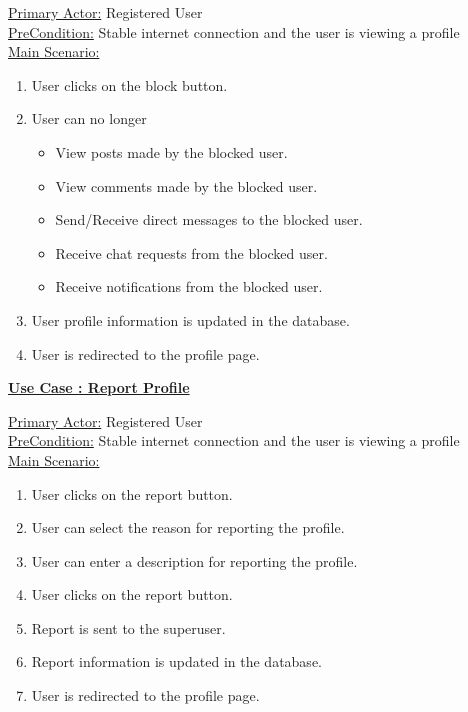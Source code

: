 \documentclass[conference,compsoc]{IEEEtran}
\newcounter{UC}
\newcommand{\nextU}{\stepcounter{UC}\theUC}
\begin{document}
\underline{Primary Actor:} Registered User\\

\underline{PreCondition:} Stable internet connection and the user is viewing a profile\\

\underline{Main Scenario:}\\

\begin{enumerate}
    \item User clicks on the block button.
    \item User can no longer
          \begin{itemize}
              \item View posts made by the blocked user.
              \item View comments made by the blocked user.
              \item Send/Receive direct messages to the blocked user.
              \item Receive chat requests from the blocked user.
              \item Receive notifications from the blocked user.
          \end{itemize}
    \item User profile information is updated in the database.
    \item User is redirected to the profile page.
\end{enumerate}

\underline{\textbf{Use Case \nextU: Report Profile}}
\vspace{0.2cm}

\underline{Primary Actor:} Registered User\\

\underline{PreCondition:} Stable internet connection and the user is viewing a profile\\

\underline{Main Scenario:}\\

\begin{enumerate}
    \item User clicks on the report button.
    \item User can select the reason for reporting the profile.
    \item User can enter a description for reporting the profile.
    \item User clicks on the report button.
    \item Report is sent to the superuser.
    \item Report information is updated in the database.
    \item User is redirected to the profile page.
\end{enumerate}
\end{document}
